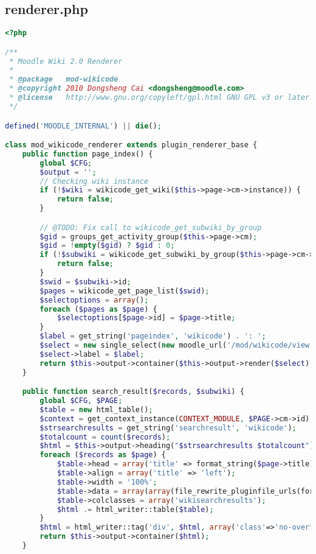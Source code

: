 \subsection{renderer.php}
\begin{lstlisting}[language=PHP]
<?php

/**
 * Moodle Wiki 2.0 Renderer
 *
 * @package   mod-wikicode
 * @copyright 2010 Dongsheng Cai <dongsheng@moodle.com>
 * @license   http://www.gnu.org/copyleft/gpl.html GNU GPL v3 or later
 */

defined('MOODLE_INTERNAL') || die();

class mod_wikicode_renderer extends plugin_renderer_base {
    public function page_index() {
        global $CFG;
        $output = '';
        // Checking wiki instance
        if (!$wiki = wikicode_get_wiki($this->page->cm->instance)) {
            return false;
        }

        // @TODO: Fix call to wikicode_get_subwiki_by_group
        $gid = groups_get_activity_group($this->page->cm);
        $gid = !empty($gid) ? $gid : 0;
        if (!$subwiki = wikicode_get_subwiki_by_group($this->page->cm->instance, $gid)) {
            return false;
        }
        $swid = $subwiki->id;
        $pages = wikicode_get_page_list($swid);
        $selectoptions = array();
        foreach ($pages as $page) {
            $selectoptions[$page->id] = $page->title;
        }
        $label = get_string('pageindex', 'wikicode') . ': ';
        $select = new single_select(new moodle_url('/mod/wikicode/view.php'), 'pageid', $selectoptions);
        $select->label = $label;
        return $this->output->container($this->output->render($select), 'wikicode_index');
    }

    public function search_result($records, $subwiki) {
        global $CFG, $PAGE;
        $table = new html_table();
        $context = get_context_instance(CONTEXT_MODULE, $PAGE->cm->id);
        $strsearchresults = get_string('searchresult', 'wikicode');
        $totalcount = count($records);
        $html = $this->output->heading("$strsearchresults $totalcount");
        foreach ($records as $page) {
            $table->head = array('title' => format_string($page->title) . ' (' . html_writer::link($CFG->wwwroot . '/mod/wikicode/view.php?pageid=' . $page->id, get_string('view', 'wikicode')) . ')');
            $table->align = array('title' => 'left');
            $table->width = '100%';
            $table->data = array(array(file_rewrite_pluginfile_urls(format_text($page->cachedcontent, FORMAT_HTML), 'pluginfile.php', $context->id, 'mod_wikicode', 'attachments', $subwiki->id)));
            $table->colclasses = array('wikisearchresults');
            $html .= html_writer::table($table);
        }
        $html = html_writer::tag('div', $html, array('class'=>'no-overflow'));
        return $this->output->container($html);
    }


\end{lstlisting}
